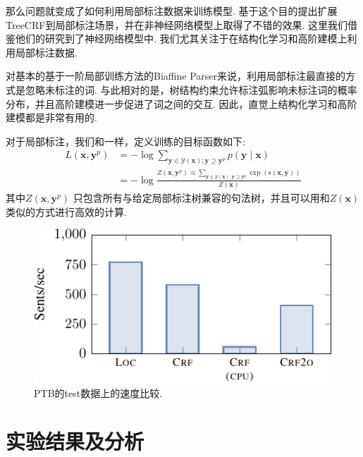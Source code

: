 那么问题就变成了如何利用局部标注数据来训练模型.
\citet{li-etal-2016-active}基于这个目的提出扩展TreeCRF到局部标注场景，并在非神经网络模型上取得了不错的效果.
这里我们借鉴他们的研究到了神经网络模型中.
我们尤其关注于在结构化学习和高阶建模上利用局部标注数据.

对基本的基于一阶局部训练方法的Biaffine Parser来说，利用局部标注最直接的方式是忽略未标注的词.
与此相对的是，树结构约束允许标注弧影响未标注词的概率分布，并且高阶建模进一步促进了词之间的交互.
因此，直觉上结构化学习和高阶建模都是非常有用的.

对于局部标注，我们和\citet{li-etal-2016-active}一样，定义训练的目标函数如下:
\begin{equation}
  \label{eq:training-loss-treecrf-partial}
  \begin{split}
    \mathit{L}(\boldsymbol{x}, {\boldsymbol{y}^p}) &= -\log \sum\limits_{\boldsymbol{y} \in \mathcal{Y}(\boldsymbol{x}); \boldsymbol{y} \supseteq {\boldsymbol{y}^p}} p(\boldsymbol{y}\mid\boldsymbol{x})  \\
    &= - \log \frac{Z(\boldsymbol{x}, {\boldsymbol{y}^p}) \equiv \sum\limits_{\boldsymbol{y} \in \mathcal{Y}(\boldsymbol{x}); \boldsymbol{y} \supseteq \boldsymbol{y}^p} \exp(\mathrm{s}(\boldsymbol{x},\boldsymbol{y}))}{Z(\boldsymbol{x})}
  \end{split}
\end{equation}
其中$Z(\boldsymbol{x}, {\boldsymbol{y}^p})$ 只包含所有与给定局部标注树兼容的句法树，并且可以用和$Z(\boldsymbol{x})$类似的方式进行高效的计算.

\begin{figure}[tb]
  \centering
  \includegraphics[scale=1.2]{figures/dep-speed.pdf}
  \caption{
    PTB的test数据上的速度比较.
  }
  \label{fig:speed}
\end{figure}

\section{实验结果及分析}\label{sec:dep-exps}

